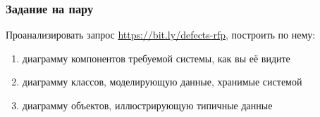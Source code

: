 \documentclass{../../slides-style}
\begin{document}
    \begin{frame}
        \frametitle{Задание на пару}
        Проанализировать запрос \url{https://bit.ly/defects-rfp}, построить по нему:
        \begin{enumerate}
            \item диаграмму компонентов требуемой системы, как вы её видите
            \item диаграмму классов, моделирующую данные, хранимые системой
            \item диаграмму объектов, иллюстрирующую типичные данные
        \end{enumerate}
    \end{frame}
\end{document}
